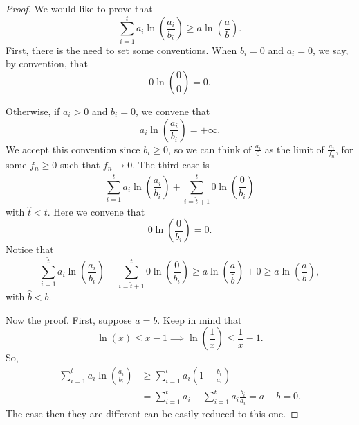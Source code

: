 \begin{proof}
	We would like to prove that
	\begin{equation*}
		\sum_{i= 1}^t a_i \ln \left( \frac{a_i}{b_i} \right)
		\ge
		a \ln \left( \frac{a}{b} \right).
	\end{equation*}
	First, there is the need to set some conventions.
	When $b_i = 0$ and $a_i = 0$, we say, by convention, that
	\begin{equation*}
		0 \ln \left( \frac{0}{0} \right) = 0.
	\end{equation*}
	 
	Otherwise, if $a_i > 0$ and $b_i = 0$, we convene that
	\begin{equation*}
		a_i \ln \left( \frac{a_i}{b_i} \right) = +\infty.
	\end{equation*}
	We accept this convention since $b_i \geq 0$, so we can think of $\frac{a_i}{0}$ as the limit of $\frac{a_i}{f_n}$, for some $f_n \ge 0$ such that $f_n \to 0$.
	The third case is
	\begin{equation*}
	  \sum_{i = 1}^{\hat{t}} a_i \ln \left( \frac{a_i}{b_i} \right)
	  +
	  \sum_{i = \hat{t} + 1}^{t} 0 \ln \left( \frac{0}{b_i} \right)
	\end{equation*}
	with $\hat{t} < t$.
	Here we convene that
	\begin{equation*}
		0 \ln \left( \frac{0}{b_i} \right) = 0.
	\end{equation*}
	Notice that 
	\begin{equation*}
		\sum_{i = 1}^{\hat{t}} a_i \ln \left( \frac{a_i}{b_i} \right)
		+
		\sum_{i = \hat{t} + 1}^{t} 0 \ln \left( \frac{0}{b_i} \right)
		\ge a \ln \left( \frac{a}{\hat{b}} \right) + 0
		\ge a \ln \left( \frac{a}{b} \right),
	\end{equation*}
	with $\hat{b} < b$.

	Now the proof.
	First, suppose $a=b$.
	Keep in mind that
	\begin{equation*}
		\ln(x) \le x - 1
		\implies
		\ln \left( \frac{1}{x} \right) \le \frac{1}{x} - 1.
	\end{equation*}
	So,
	\begin{align*}
		\sum_{i = 1}^{t} a_i \ln \left( \frac{a_i}{b_i} \right)
		& \ge
		\sum_{i = 1}^{t} a_i \left( 1 - \frac{b_i}{a_i} \right)
		\tag{w. eq. iff $a=b$}
		\\
		& =
		\sum_{i = 1}^{t} a_i - \sum_{i = 1}^{t} a_i \frac{b_i}{a_i}
		=
		a - b = 0.
	\end{align*}
	The case then they are different can be easily reduced to this one.


\end{proof}
